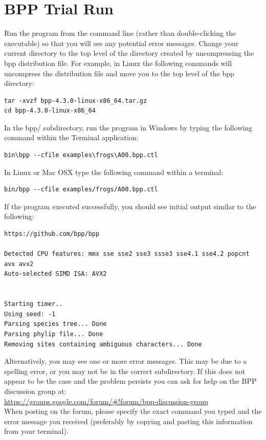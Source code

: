 \documentclass{book}
\numberwithin{equation}{section} \renewcommand{\baselinestretch}{0.55}
\begin{document}
\section{BPP Trial Run}\label{trial}
Run the program from the command line (rather than double-clicking the
executable) so that you will see any potential error messages.  Change
your current directory to the top level of the directory created by
uncompressing the bpp distribution file. For example, in Linux the
following commands will uncompress the distribution file and move you
to the top level of the bpp directory: {\color{red}
\begin{verbatim}
tar -xvzf bpp-4.3.0-linux-x86_64.tar.gz
cd bpp-4.3.0-linux-x86_64
\end{verbatim}
}
\noindent
In the bpp/ subdirectory, run the program in Windows by typing the
following command within the Terminal application: {\color{red}
\begin{verbatim}
bin\bpp --cfile examples\frogs\A00.bpp.ctl
\end{verbatim}}
  \noindent
  In Linux or Mac OSX type the following command within a terminal:
  {\color{red}
\begin{verbatim}
bin/bpp --cfile examples/frogs/A00.bpp.ctl
\end{verbatim}}  
    \noindent
    If the program executed successfully, you should see initial
    output similar to the following:
{\small
\begin{verbatim}
https://github.com/bpp/bpp

Detected CPU features: mmx sse sse2 sse3 ssse3 sse4.1 sse4.2 popcnt avx avx2
Auto-selected SIMD ISA: AVX2


Starting timer..
Using seed: -1
Parsing species tree... Done
Parsing phylip file... Done
Removing sites containing ambiguous characters... Done
\end{verbatim}
}
\noindent
Alternatively, you may see one or more error messages. This may be
due to a spelling error, or you may not be in the correct
subdirectory. If this does not appear to be the case and the
problem persists you can ask for help on the \textsc{BPP}
discussion group at:
\newline \noindent \hspace{0.1pt} \\
\href{https://groups.google.com/forum/#!forum/bpp-discussion-group}{https://groups.google.com/forum/\#!forum/bpp-discussion-group}
\newline \hspace{0.1pt} \\
When posting on the forum, please specify the exact command you
typed and the error message you received (preferably by copying
and pasting this information from your terminal).
\end{document}
